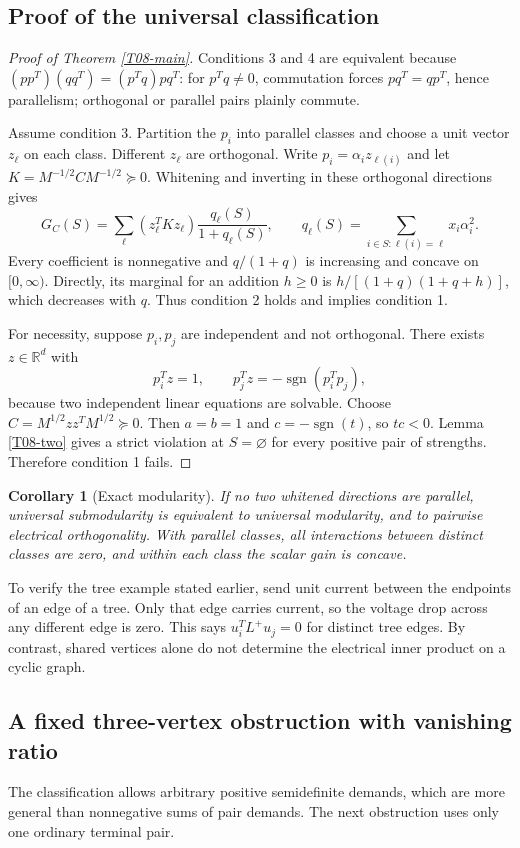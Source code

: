 \documentclass[11pt,a4paper]{article}
\newtheorem{corollary}[theorem]{Corollary}
\theoremstyle{definition}\newtheorem{definition}[theorem]{Definition}
\theoremstyle{remark}\newtheorem{remark}[theorem]{Remark}
\newcommand{\R}{\mathbb R}\newcommand{\C}{\mathbb C}\newcommand{\N}{\mathbb N}
\numberwithin{equation}{section}
\begin{document}
\subsection{Proof of the universal classification}\label{T08-sec-3}
\begin{proof}[Proof of Theorem \ref{T08-main}]
Conditions 3 and 4 are equivalent because
$(pp^T)(qq^T)=(p^Tq)pq^T$: for $p^Tq\ne0$, commutation forces $pq^T=qp^T$, hence parallelism; orthogonal or parallel pairs plainly commute.

Assume condition 3. Partition the $p_i$ into parallel classes and choose a unit vector $z_\ell$ on each class. Different $z_\ell$ are orthogonal. Write $p_i=\alpha_i z_{\ell(i)}$ and let $K=M^{-1/2}CM^{-1/2}\succeq0$. Whitening and inverting in these orthogonal directions gives
\[
 G_C(S)=\sum_\ell (z_\ell^TKz_\ell)\frac{q_\ell(S)}{1+q_\ell(S)},\qquad
 q_\ell(S)=\sum_{i\in S:\ell(i)=\ell}x_i\alpha_i^2.
\]
Every coefficient is nonnegative and $q/(1+q)$ is increasing and concave on $[0,\infty)$. Directly, its marginal for an addition $h\ge0$ is
$h/[(1+q)(1+q+h)]$, which decreases with $q$. Thus condition 2 holds and implies condition 1.

For necessity, suppose $p_i,p_j$ are independent and not orthogonal. There exists $z\in\R^d$ with
\[
 p_i^Tz=1,\qquad p_j^Tz=-\operatorname{sgn}(p_i^Tp_j),
\]
because two independent linear equations are solvable. Choose
$C=M^{1/2}zz^TM^{1/2}\succeq0$. Then $a=b=1$ and
$c=-\operatorname{sgn}(t)$, so $tc<0$. Lemma \ref{T08-two} gives a strict violation at $S=\varnothing$ for every positive pair of strengths. Therefore condition 1 fails.
\end{proof}
\begin{corollary}[Exact modularity]
If no two whitened directions are parallel, universal submodularity is equivalent to universal modularity, and to pairwise electrical orthogonality. With parallel classes, all interactions between distinct classes are zero, and within each class the scalar gain is concave.
\end{corollary}
To verify the tree example stated earlier, send unit current between the endpoints of an edge of a tree. Only that edge carries current, so the voltage drop across any different edge is zero. This says $u_i^TL^+u_j=0$ for distinct tree edges. By contrast, shared vertices alone do not determine the electrical inner product on a cyclic graph.

\subsection{A fixed three-vertex obstruction with vanishing ratio}\label{T08-sec-4}
The classification allows arbitrary positive semidefinite demands, which are more general than nonnegative sums of pair demands. The next obstruction uses only one ordinary terminal pair.
\end{document}
